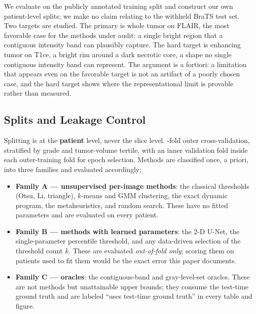 We evaluate on the publicly annotated training split and construct our own
patient-level splits; we make no claim relating to the withheld BraTS test set.
Two targets are studied. The primary is whole tumor on FLAIR, the most favorable
case for the methods under audit: a single bright region that a contiguous
intensity band can plausibly capture. The hard target is enhancing tumor on
T1ce, a bright rim around a dark necrotic core, a shape no single contiguous
intensity band can represent. The argument is a fortiori: a limitation that
appears even on the favorable target is not an artifact of a poorly chosen case,
and the hard target shows where the representational limit is provable rather
than measured.

\subsection{Splits and Leakage Control}

Splitting is at the \textbf{patient} level, never the slice level.
\nfolds-fold outer cross-validation, stratified by grade and tumor-volume
tertile, with an inner validation fold inside each outer-training fold for
epoch selection. Methods are classified once, a priori, into three families and
evaluated accordingly:

\begin{itemize}
  \item \textbf{Family A --- unsupervised per-image methods}: the classical
  thresholds (Otsu, Li, triangle), $k$-means and GMM clustering, the exact
  dynamic program, the metaheuristics, and random search. These have no fitted
  parameters and are evaluated on every patient.
  \item \textbf{Family B --- methods with learned parameters}: the 2-D U-Net,
  the single-parameter percentile threshold, and any data-driven selection of the
  threshold count $k$. These are evaluated \emph{out-of-fold only}; scoring them
  on patients used to fit them would be the exact error this paper documents.
  \item \textbf{Family C --- oracles}: the contiguous-band and gray-level-set
  oracles. These are not methods but unattainable upper bounds; they consume the
  test-time ground truth and are labeled ``uses test-time ground truth'' in every
  table and figure.
\end{itemize}

